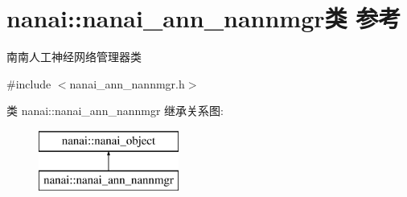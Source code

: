 \hypertarget{classnanai_1_1nanai__ann__nannmgr}{}\section{nanai\+:\+:nanai\+\_\+ann\+\_\+nannmgr类 参考}
\label{classnanai_1_1nanai__ann__nannmgr}


南南人工神经网络管理器类  




{\ttfamily \#include $<$nanai\+\_\+ann\+\_\+nannmgr.\+h$>$}

类 nanai\+:\+:nanai\+\_\+ann\+\_\+nannmgr 继承关系图\+:\begin{figure}[H]
\begin{center}
\leavevmode
\includegraphics[height=2.000000cm]{classnanai_1_1nanai__ann__nannmgr}
\end{center}
\end{figure}
